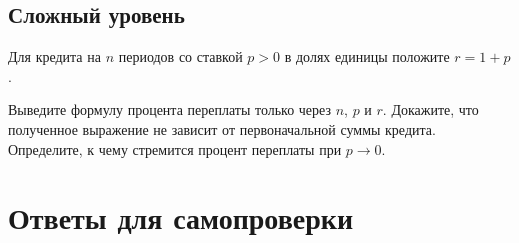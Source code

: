\documentclass[a4paper,12pt]{article}
\begin{document}
\subsection*{Сложный уровень}

\begin{training}[resume]
  \item
  Для кредита на \(n\) периодов со ставкой \(p>0\) в долях единицы положите
  \(r=1+p\).

  Выведите формулу процента переплаты только через \(n\), \(p\) и \(r\).
  Докажите, что полученное выражение не зависит от первоначальной суммы
  кредита. Определите, к чему стремится процент переплаты при
  \(p\to0\).
\end{training}


\newpage

\section*{Ответы для самопроверки}
\end{document}
